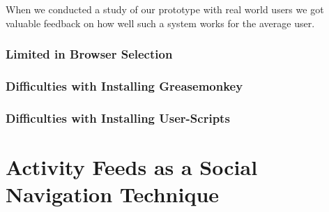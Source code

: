 When we conducted a study of our prototype with real world users
we got valuable feedback on how well such a system works for the average user.


\subsubsection{Limited in Browser Selection}

\subsubsection{Difficulties with Installing Greasemonkey}

\subsubsection{Difficulties with Installing User-Scripts}


\section{Activity Feeds as a Social Navigation Technique}
